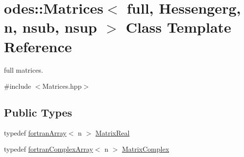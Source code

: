 \hypertarget{classodes_1_1Matrices}{}\section{odes\+:\+:Matrices$<$ full, Hessengerg, n, nsub, nsup $>$ Class Template Reference}
\label{classodes_1_1Matrices}


full matrices.  




{\ttfamily \#include $<$Matrices.\+hpp$>$}

\subsection*{Public Types}
\begin{DoxyCompactItemize}
\item 
typedef \hyperlink{classodes_1_1fortranArray}{fortran\+Array}$<$ n $>$ \hyperlink{classodes_1_1Matrices_aa028f1e52916558a51d333ac8b081030}{Matrix\+Real}
\item 
typedef \hyperlink{classodes_1_1fortranComplexArray}{fortran\+Complex\+Array}$<$ n $>$ \hyperlink{classodes_1_1Matrices_aa1313b5ab7fdab6f5320c8d5aa3bfc24}{Matrix\+Complex}
\end{DoxyCompactItemize}
